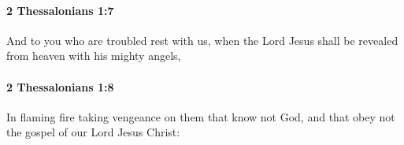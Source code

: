 		\paragraph{2 Thessalonians 1:7} %
			\label{2THESSALONIANS-1-7}

			And to you who are troubled rest with us, when the Lord Jesus shall be revealed from heaven with his mighty angels,

			\begin{framed}
			\scriptsize
				\begin{compactdesc}
					\item[SBLG] 
				\end{compactdesc}
			\end{framed}

		\paragraph{2 Thessalonians 1:8} %
			\label{2THESSALONIANS-1-8}

			In flaming fire taking vengeance on them that know not God, and that obey not the gospel of our Lord Jesus Christ:


